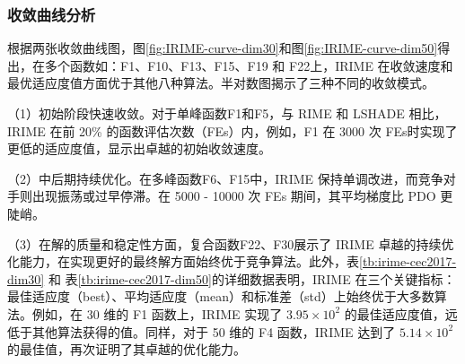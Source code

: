 \documentclass{wzuthesis}
\begin{document}
\subsubsection{收敛曲线分析}
根据两张收敛曲线图，图\ref{fig:IRIME-curve-dim30}和图\ref{fig:IRIME-curve-dim50}得出，在多个函数如：F1、F10、F13、F15、F19 和 F22上，IRIME 在收敛速度和最优适应度值方面优于其他八种算法。半对数图揭示了三种不同的收敛模式。

（1）初始阶段快速收敛。对于单峰函数F1和F5，与 RIME 和 LSHADE 相比，IRIME 在前 20\% 的函数评估次数（FEs）内，例如，F1 在 3000 次 FEs时实现了更低的适应度值，显示出卓越的初始收敛速度。

（2）中后期持续优化。在多峰函数F6、F15中，IRIME 保持单调改进，而竞争对手则出现振荡或过早停滞。在 5000 - 10000 次 FEs 期间，其平均梯度比 PDO 更陡峭。

（3）在解的质量和稳定性方面，复合函数F22、F30展示了 IRIME 卓越的持续优化能力，在实现更好的最终解方面始终优于竞争算法。此外，表\ref{tb:irime-cec2017-dim30} 和 表\ref{tb:irime-cec2017-dim50}的详细数据表明，IRIME 在三个关键指标：最佳适应度（best）、平均适应度（mean）和标准差（std）上始终优于大多数算法。例如，在 30 维的 F1 函数上，IRIME 实现了 ${3.95} \times  {10}^{2}$ 的最佳适应度值，远低于其他算法获得的值。同样，对于 50 维的 F4 函数，IRIME 达到了 ${5.14} \times  {10}^{2}$ 的最佳值，再次证明了其卓越的优化能力。
\end{document}
